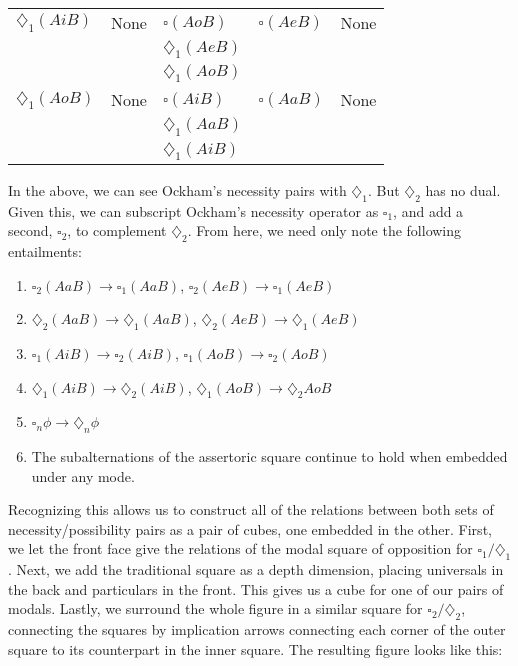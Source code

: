 \documentclass[a4paper]{article}
\begin{document}
\begin{tabular}{|l|l|l|l|l|}
$\diamondsuit_{1}(AiB)$ & None & $\square(AoB)$ & $\square(AeB)$ & None \\

& & $\diamondsuit_{1}(AeB)$ & & \\

& & $\diamondsuit_{1}(AoB)$ & & \\ \hline

$\diamondsuit_{1}(AoB)$ & None & $\square(AiB)$ & $\square(AaB)$ & None \\

& & $\diamondsuit_{1}(AaB)$ & & \\

& & $\diamondsuit_{1}(AiB)$ & & \\ \hline
\end{tabular}

In the above, we can see Ockham's necessity pairs with $\diamondsuit_{1}$. But $\diamondsuit_{2}$ has no dual. Given this, we can subscript Ockham's necessity operator as $\square_{1}$, and add a second, $\square_{2}$, to complement $\diamondsuit_{2}$. From here, we need only note the following entailments:
\begin{enumerate}
	\item $\square_{2}(AaB) \rightarrow \square_{1}(AaB)$, $\square_{2}(AeB) \rightarrow \square_{1}(AeB)$
	\item $\diamondsuit_{2}(AaB) \rightarrow \diamondsuit_{1}(AaB)$, $\diamondsuit_{2}(AeB) \rightarrow \diamondsuit_{1}(AeB)$
	\item $\square_{1}(AiB) \rightarrow \square_{2}(AiB)$, $\square_{1}(AoB) \rightarrow \square_{2}(AoB)$
	\item $\diamondsuit_{1}(AiB) \rightarrow \diamondsuit_{2}(AiB)$, $\diamondsuit_{1}(AoB) \rightarrow \diamondsuit_{2}AoB$ 
	\item $\square_{n}\phi \rightarrow \diamondsuit_{n}\phi$
	\item The subalternations of the assertoric square continue to hold when embedded under any mode. 
\end{enumerate}
\noindent Recognizing this allows us to construct all of the relations between both sets of necessity/possibility pairs as a pair of cubes, one embedded in the other. First, we let the front face give the relations of the modal square of opposition for $\square_{1}/\diamondsuit_{1}$. Next, we add the traditional square as a depth dimension, placing universals in the back and particulars in the front. This gives us a cube for one of our pairs of modals. Lastly, we surround the whole figure in a similar square for $\square_{2}/\diamondsuit_{2}$, connecting the squares by implication arrows connecting each corner of the outer square to its counterpart in the inner square. The resulting figure looks like this:
\end{document}
